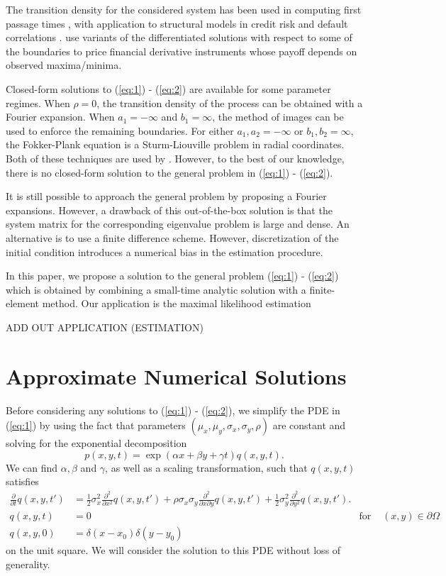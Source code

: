 \documentclass[10pt]{article}
\begin{document}
The transition density for the considered system has been used in
computing first passage times \citep{kou2016first,
  sacerdote2016first}, with application to structural models in credit
risk and default correlations \citep{haworth2008modelling,
  ching2014correlated}. \cite{he1998double} use variants of the
differentiated solutions with respect to some of the boundaries to
price financial derivative instruments whose payoff depends on
observed maxima/minima. 

Closed-form solutions to (\ref{eq:1}) - (\ref{eq:2}) are available for
some parameter regimes. When $\rho = 0$, the transition density of the
process can be obtained with a Fourier expansion. When $a_1 = -\infty$
and $b_1 = \infty$, the method of images can be used to enforce the
remaining boundaries. For either $a_1, a_2 = -\infty$ or
$b_1, b_2 = \infty$, the Fokker-Plank equation is a Sturm-Liouville
problem in radial coordinates. Both of these techniques are used by
\cite{he1998double}. However, to the best of our knowledge, there is
no closed-form solution to the general problem in (\ref{eq:1}) -
(\ref{eq:2}).

It is still possible to approach the general problem by proposing a
Fourier expansions. However, a drawback of this out-of-the-box
solution is that the system matrix for the corresponding eigenvalue
problem is large and dense. An alternative is to use a finite
difference scheme. However, discretization of the initial condition
introduces a numerical bias in the estimation procedure.

In this paper, we propose a solution to the general problem
(\ref{eq:1}) - (\ref{eq:2}) which is obtained by combining a
small-time analytic solution with a finite-element method. Our
application is the maximal likelihood estimation

ADD OUT APPLICATION (ESTIMATION)

\section{Approximate Numerical Solutions}
Before considering any solutions to (\ref{eq:1}) - (\ref{eq:2}), we
simplify the PDE in (\ref{eq:1}) by using the fact that parameters
$(\mu_x, \mu_y, \sigma_x, \sigma_y, \rho)$ are constant and solving
for the exponential decomposition
\[
  p(x,y,t) = \exp(\alpha x + \beta y + \gamma t) q(x,y,t).
\]
We can find $\alpha, \beta$ and $\gamma$, as well as a scaling
transformation, such that $q(x,y,t)$ satisfies
\begin{align}
  \frac{\partial}{\partial t} q(x,y,t') &= \frac{1}{2}\sigma_x^2
  \frac{\partial^2}{\partial x^2}q(x,y,t') + \rho\sigma_x\sigma_y
  \frac{\partial^2}{\partial x \partial y}q(x,y,t') +
  \frac{1}{2}\sigma_y^2 \frac{\partial^2}{\partial y^2}q(x,y,t').
                                          \label{eq:qq} \\
  q(x,y,t) &=0 &\mbox{for } & (x,y) \in \partial \Omega \nonumber \\
  q(x,y,0) &= \delta(x-x_0) \delta(y-y_0) \nonumber
\end{align}
on the unit square.  We will consider the solution to this PDE without
loss of generality.
\end{document}
